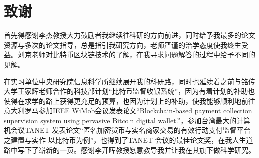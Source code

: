  
\chapter{致谢}
首先得感谢李杰教授大力鼓励者我继续往科研的方向前进，同时给予我最多的论文资源与多次的论文指导，总是指引我研究方向，老师严谨的治学态度使我终生受益。刘京老师对比特币区块链技术的了解，在我寻求问题解答的过程中给予不同的见解。

在实习单位中央研究院信息科学所继续展开我的科研路，同时也延续着之前与铭传大学王家辉老师合作的科技部计划“比特币监督收银系统”，因为有着计划的补助也使得在求学的路上获得更充足的预算，也因为计划上的补助，使我能够顺利地前往意大利罗马参加IEEE WiMob会议发表论文“Blockchain-based payment collection supervision system using pervasive Bitcoin digital wallet.”，参加台湾最大的计算机会议TANET 发表论文“匿名加密货币与实名商家交易的有效行动支付监督平台之建置与实作-以比特币为例”\supercite{tanet}，也得到了TANET 会议的最佳论文奖，在我人生道路中写下了崭新的一页。感谢李开晖教授愿意教导我并让我在其旗下做科学研究。